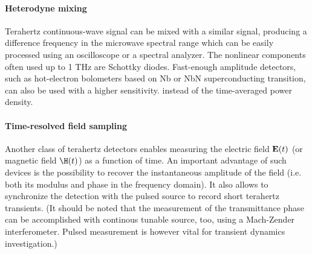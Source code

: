\paragraph{Heterodyne mixing}%
Terahertz continuous-wave signal can be mixed with a similar signal, producing a difference frequency in the microwave spectral range which can be easily processed using an oscilloscope or a spectral analyzer. The nonlinear components often used up to 1 THz are Schottky diodes. Fast-enough amplitude detectors, such as hot-electron bolometers based on Nb or NbN superconducting transition, can also be used with a higher sensitivity.\cite{lee2008book}
 instead of the time-averaged power density.

\paragraph{Time-resolved field sampling}%
Another class of terahertz detectors enables measuring the electric field $\mathbf{E}(t)$ (or magnetic field $\H(t)$) as a function of time. An important advantage of such devices is the possibility to recover the instantaneous amplitude of the field (i.e. both its modulus and phase in the frequency domain). It also allows to synchronize the detection with the pulsed source to record short terahertz transients.
(It should be noted that the measurement of the transmittance phase can be accomplished with continous tunable source, too, using a Mach-Zender interferometer.
Pulsed measurement is however vital for transient dynamics investigation.)

